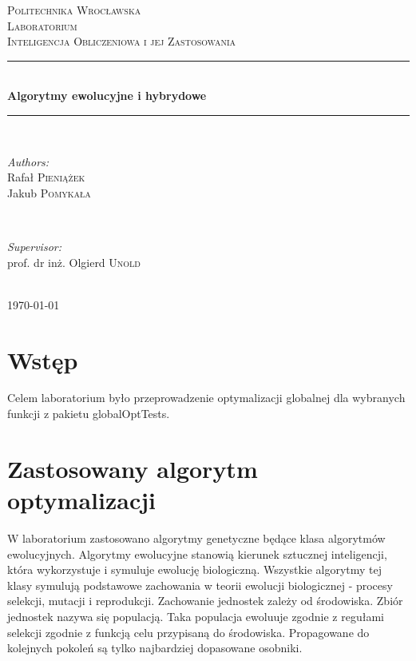 \documentclass{article}
\begin{document}
	
	\begin{titlepage}
		\center
		\newcommand{\HRule}{\rule{\linewidth}{0.6mm}}
		
		\textsc{\LARGE Politechnika Wrocławska}\\[1.5cm]
		\textsc{\Large Laboratorium}\\[0.5cm] 
		\textsc{\large Inteligencja Obliczeniowa i jej Zastosowania}\\[0.7cm] 

		\HRule \\[0.4cm]
		{ \huge \bfseries Algorytmy ewolucyjne i hybrydowe}\\[0.4cm]
		\HRule \\[1.5cm]
		
		\begin{minipage}{0.4\textwidth}
			\begin{flushleft} \large
				\emph{Authors:}\\
				Rafał \textsc{Pieniążek}\\
                Jakub \textsc{Pomykała}
			\end{flushleft}
		\end{minipage}
		~
		\begin{minipage}{0.4\textwidth}
			\begin{flushright} \large
				\emph{Supervisor:} \\
				prof. dr inż. Olgierd \textsc{Unold} 
			\end{flushright}
		\end{minipage}\\[4cm]

		{\large \today}\\[3cm]
		
		\vfill
		
	\end{titlepage}
\tableofcontents
\newpage
\listoffigures
\newpage
\section{Wstęp}
	Celem laboratorium było przeprowadzenie optymalizacji globalnej dla wybranych funkcji z pakietu globalOptTests.
    

\section{Zastosowany algorytm optymalizacji}

W laboratorium zastosowano algorytmy genetyczne będące klasa algorytmów ewolucyjnych.
Algorytmy ewolucyjne stanowią kierunek sztucznej inteligencji, która wykorzystuje i symuluje ewolucję biologiczną. Wszystkie algorytmy tej klasy symulują podstawowe zachowania w teorii ewolucji biologicznej - procesy selekcji, mutacji i reprodukcji. Zachowanie jednostek zależy od środowiska. Zbiór jednostek nazywa się populacją. Taka populacja ewoluuje zgodnie z regułami selekcji zgodnie z funkcją celu przypisaną do środowiska. Propagowane do kolejnych pokoleń są tylko najbardziej dopasowane osobniki.
\end{document}
